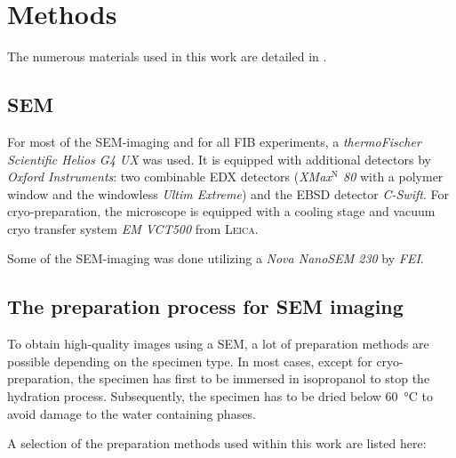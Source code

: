 \chapter{Methods}
\label{sec:methods}

The numerous materials used in this work are detailed in .

\section{\acs*{SEM}}
\label{sec:sem}

For most of the \ac{SEM}-imaging and for all \ac{FIB} experiments, a \textit{thermoFischer Scientific Helios G4 UX} was used.
It is equipped with additional detectors by \textit{Oxford Instruments}: two combinable \ac{EDX} detectors (\textit{XMax$^\text{N}$ 80} with a polymer window and the windowless \textit{Ultim Extreme}) and the \ac{EBSD} detector \textit{C-Swift}.
For cryo-preparation, the microscope is equipped with a cooling stage and vacuum cryo transfer system \textit{EM VCT500} from \textsc{Leica}.

Some of the \ac{SEM}-imaging was done utilizing a \textit{Nova NanoSEM 230} by \textit{FEI}.


\section{The preparation process for \acs*{SEM} imaging}

To obtain high-quality images using a \ac{SEM}, a lot of preparation methods are possible depending on the specimen type.
In most cases, except for cryo-preparation, the specimen has first to be immersed in isopropanol to stop the hydration process.
Subsequently, the specimen has to be dried below \qty{60}{\celsius} to avoid damage to the water containing phases.

A selection of the preparation methods used within this work are listed here:

